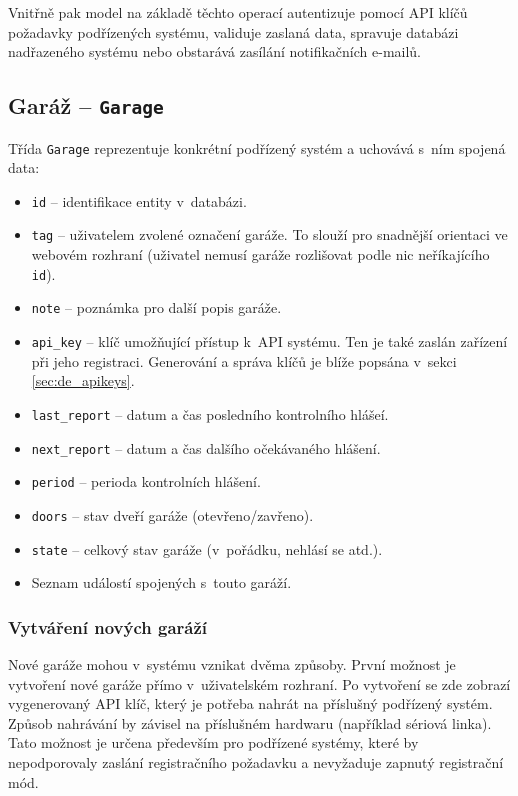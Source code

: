 Vnitřně pak model na základě těchto operací autentizuje pomocí API klíčů požadavky podřízených systému, validuje zaslaná data, spravuje databázi nadřazeného systému nebo obstarává zasílání notifikačních e-mailů.

\subsection{Garáž -- \texttt{Garage}}

Třída \texttt{Garage} reprezentuje konkrétní podřízený systém a uchovává s~ním spojená data:

\begin{itemize}
    \item \texttt{id} -- identifikace entity v~databázi.
    \item \texttt{tag} -- uživatelem zvolené označení garáže. To slouží pro snadnější orientaci ve webovém rozhraní (uživatel nemusí garáže rozlišovat podle nic neříkajícího \texttt{id}).
    \item \texttt{note} -- poznámka pro další popis garáže.
    \item \texttt{api\_key} -- klíč umožňující přístup k~API systému. Ten je také zaslán zařízení při jeho registraci. Generování a správa klíčů je blíže popsána v~sekci \ref{sec:de_apikeys}.
    \item \texttt{last\_report} -- datum a čas posledního kontrolního hlášeí.
    \item \texttt{next\_report} -- datum a čas dalšího očekávaného hlášení.
    \item \texttt{period} -- perioda kontrolních hlášení.
    \item \texttt{doors} -- stav dveří garáže (otevřeno/zavřeno).
    \item \texttt{state} -- celkový stav garáže (v~pořádku, nehlásí se atd.).
    \item Seznam událostí spojených s~touto garáží.
\end{itemize}

\subsubsection{Vytváření nových garáží}
\label{sec:de_add_garage}

Nové garáže mohou v~systému vznikat dvěma způsoby. První možnost je vytvoření nové garáže přímo v~uživatelském rozhraní. Po vytvoření se zde zobrazí vygenerovaný API klíč, který je potřeba nahrát na příslušný podřízený systém. Způsob nahrávání by závisel na příslušném hardwaru (například sériová linka). Tato možnost je určena především pro podřízené systémy, které by nepodporovaly zaslání registračního požadavku a nevyžaduje zapnutý registrační mód.

